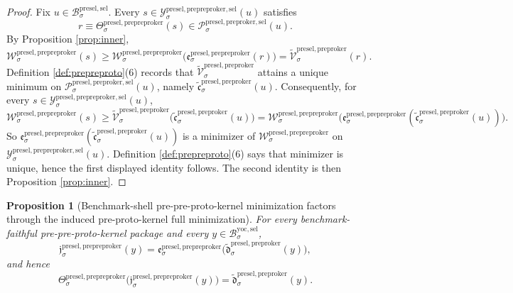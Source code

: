 \documentclass[11pt]{article}
\newcommand{\YoctoSelectorBody}[1]{\mathcal B_{#1}^{\mathrm{yoc,sel}}}
\newcommand{\PreSectionSelectorBody}[1]{\mathcal B_{#1}^{\mathrm{presel,sel}}}
\newcommand{\PreProtoKernelSelectorFiber}[2]{\mathcal P_{#1}^{\mathrm{presel,preproker,sel}}(#2)}
\newcommand{\PrePreProtoKernelProj}[1]{\Theta_{#1}^{\mathrm{presel,prepreproker}}}
\newcommand{\PrePreProtoKernelFunctional}[1]{\mathscr W_{#1}^{\mathrm{presel,prepreproker}}}
\newcommand{\PrePreProtoKernelMinLift}[1]{\mathfrak e_{#1}^{\mathrm{presel,prepreproker}}}
\newcommand{\PrePreProtoKernelSelectorFiber}[2]{\mathcal Y_{#1}^{\mathrm{presel,prepreproker,sel}}(#2)}
\newcommand{\PrePreProtoKernelFullMin}[1]{\mathfrak j_{#1}^{\mathrm{presel,prepreproker}}}
\newcommand{\InducedPreProtoKernelFunctional}[1]{\widetilde{\mathscr V}_{#1}^{\mathrm{presel,preproker}}}
\newcommand{\InducedPreProtoKernelSelectorMin}[1]{\widetilde{\mathfrak c}_{#1}^{\mathrm{presel,preproker}}}
\newcommand{\InducedPreProtoKernelFullMin}[1]{\widetilde{\mathfrak d}_{#1}^{\mathrm{presel,preproker}}}
\newtheorem{proposition}{Proposition}
\begin{document}
\begin{proof}
Fix \(u\in\PreSectionSelectorBody{\sigma}\). Every \(s\in\PrePreProtoKernelSelectorFiber{\sigma}{u}\) satisfies
\[
r\equiv\PrePreProtoKernelProj{\sigma}(s)\in\PreProtoKernelSelectorFiber{\sigma}{u}.
\]
By Proposition \ref{prop:inner},
\[
\PrePreProtoKernelFunctional{\sigma}(s)
\geq
\PrePreProtoKernelFunctional{\sigma}\bigl(\PrePreProtoKernelMinLift{\sigma}(r)\bigr)
=
\InducedPreProtoKernelFunctional{\sigma}(r).
\]
Definition \ref{def:prepreproto}(6) records that \(\InducedPreProtoKernelFunctional{\sigma}\) attains a unique minimum on \(\PreProtoKernelSelectorFiber{\sigma}{u}\), namely \(\InducedPreProtoKernelSelectorMin{\sigma}(u)\). Consequently, for every \(s\in\PrePreProtoKernelSelectorFiber{\sigma}{u}\),
\[
\PrePreProtoKernelFunctional{\sigma}(s)
\geq
\InducedPreProtoKernelFunctional{\sigma}\bigl(\InducedPreProtoKernelSelectorMin{\sigma}(u)\bigr)
=
\PrePreProtoKernelFunctional{\sigma}\bigl(\PrePreProtoKernelMinLift{\sigma}(\InducedPreProtoKernelSelectorMin{\sigma}(u))\bigr).
\]
So \(\PrePreProtoKernelMinLift{\sigma}(\InducedPreProtoKernelSelectorMin{\sigma}(u))\) is a minimizer of \(\PrePreProtoKernelFunctional{\sigma}\) on \(\PrePreProtoKernelSelectorFiber{\sigma}{u}\). Definition \ref{def:prepreproto}(6) says that minimizer is unique, hence the first displayed identity follows. The second identity is then Proposition \ref{prop:inner}.
\end{proof}

\begin{proposition}[Benchmark-shell pre-pre-proto-kernel minimization factors through the induced pre-proto-kernel full minimization]
\label{prop:fullfactor}
For every benchmark-faithful pre-pre-proto-kernel package and every \(y\in\YoctoSelectorBody{\sigma}\),
\[
\PrePreProtoKernelFullMin{\sigma}(y)
=
\PrePreProtoKernelMinLift{\sigma}\bigl(\InducedPreProtoKernelFullMin{\sigma}(y)\bigr),
\]
and hence
\[
\PrePreProtoKernelProj{\sigma}\bigl(\PrePreProtoKernelFullMin{\sigma}(y)\bigr)
=
\InducedPreProtoKernelFullMin{\sigma}(y).
\]
\end{proposition}
\end{document}
